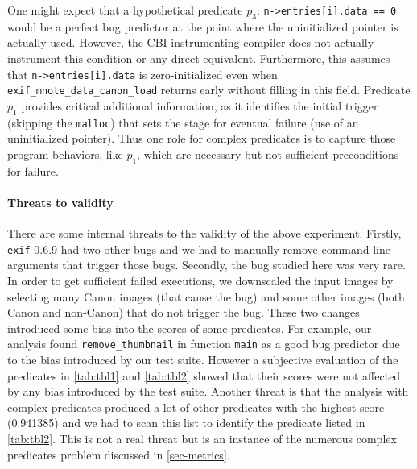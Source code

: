 One might expect that a hypothetical predicate $p_3$: \texttt{n->entries[i].data == 0} would be a perfect bug predictor at the point where the uninitialized pointer is actually used.  However, the CBI instrumenting compiler does not actually instrument this condition or any direct equivalent.  Furthermore, this assumes that \texttt{n->entries[i].data} is zero-initialized even when \texttt{exif\_mnote\_data\_canon\_load} returns early without filling in this field.  Predicate $p_1$ provides critical additional information, as it identifies the initial trigger (skipping the \texttt{malloc}) that sets the stage for eventual failure (use of an uninitialized pointer).  Thus one role for complex predicates is to capture those program behaviors, like $p_1$, which are necessary but not sufficient preconditions for failure.

\paragraph{Threats to validity}

There are some internal threats to the validity of the above experiment.  Firstly, \texttt{exif} 0.6.9 had two other bugs and we had to manually remove command line arguments that trigger those bugs.  Secondly, the bug studied here was very rare.  In order to get sufficient failed executions, we downscaled the input images by selecting many Canon images (that cause the bug) and some other images (both Canon and non-Canon) that do not trigger the bug.  These two changes introduced some bias into the scores of some predicates.  For example, our analysis found \texttt{remove\_thumbnail} in function \texttt{main} as a good bug predictor due to the bias introduced by our test suite.  However a subjective evaluation of the predicates in \autoref{tab:tbl1} and \autoref{tab:tbl2} showed that their scores were not affected by any bias introduced by the test suite.  Another threat is that the analysis with complex predicates produced a lot of other predicates with the highest score (0.941385) and we had to scan this list to identify the predicate listed in \autoref{tab:tbl2}.  This is not a real threat but is an instance of the numerous complex predicates problem discussed in \autoref{sec-metrics}.

